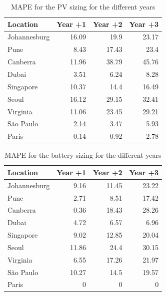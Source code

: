 \begin{table}[H]
  
  \caption{MAPE for the PV sizing for the different years }\label{tab:mapes_pv} \centering

  \begin{tabular}{|l|r|r|r|}
   \hline
    
  \textbf{Location} &   \textbf{Year +1} & \textbf{Year +2} & \textbf{Year +3}  \\
  \hline
  Johannesburg & 16.09 & 19.9 & 23.17  \\
  \hline
  Pune  &  8.43 & 17.43 & 23.4 \\
  \hline
  Canberra  & 11.96 & 38.79 & 45.76 \\
  \hline
  Dubai   &  3.51 & 6.24   & 8.28  \\
  \hline
  Singapore &  10.37 & 14.4 & 16.49 \\
  \hline     
  Seoul    &  16.12 & 29.15 & 32.41    \\
  \hline
  Virginia   &  11.06 & 23.45 & 29.21 \\
  \hline
  São Paulo   &  2.14 &  3.47 & 5.93 \\
  \hline 
  Paris    &  0.14 & 0.92 &  2.78 \\
  \hline  

\end{tabular}
\end{table}



\begin{table}[H]
  
  \caption{MAPE for the battery sizing for the different years }\label{tab:mapes_bat} \centering

  \begin{tabular}{|l|r|r|r|}
   \hline
    
  \textbf{Location} &   \textbf{Year +1} & \textbf{Year +2} & \textbf{Year +3}  \\
  \hline
  Johannesburg & 9.16 & 11.45 & 23.22  \\
  \hline
  Pune  &  2.71 & 8.51 & 17.42 \\
  \hline
  Canberra  & 0.36 & 18.43 & 28.26 \\
  \hline
  Dubai   &  4.72 & 6.57 & 6.96  \\
  \hline
  Singapore &  9.02 & 12.85 & 20.04 \\
  \hline     
  Seoul    &  11.86 & 24.4 & 30.15   \\
  \hline
  Virginia   &  6.55 & 17.26 & 21.97 \\
  \hline
  São Paulo   &  10.27 &  14.5 & 19.57 \\
  \hline 
  Paris    &  0 & 0 &  0 \\
  \hline  

\end{tabular}
\end{table}


